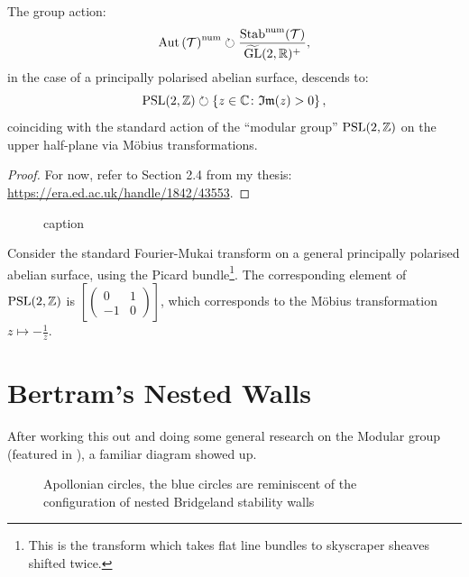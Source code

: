 \documentclass[]{article}
\begin{document}
\begin{theorem}
	\label{thm:modular_group_action}
	The group action:
	\[
		\mathrm{Aut}\left(\mathcal{T}\right)^{\mathrm{num}}
		\circlearrowright
		\frac{
			\mathrm{Stab}^{\mathrm{num}}(\mathcal{T})
		}{
			\widetilde{\mathrm{GL}}(2,\mathbb{R})^+
		},
	\]
	\noindent
	in the case of a principally polarised abelian surface, descends to:
	\[
		\mathrm{PSL}(2, \mathbb{Z})
		\circlearrowright
		\left\{
		z \in \mathbb{C}
		\colon
		\mathfrak{Im}(z) > 0
		\right\},
	\]
	coinciding with the standard action of
	the ``modular group'' $\mathrm{PSL}(2, \mathbb{Z})$
	on the upper half-plane via Möbius transformations.
\end{theorem}

\begin{proof}
	For now, refer to Section 2.4 from my thesis: \url{https://era.ed.ac.uk/handle/1842/43553}.
\end{proof}

\begin{figure}
	
	\caption{caption}
\end{figure}

\begin{example}
	Consider the standard Fourier-Mukai transform on a general principally polarised abelian surface, using the Picard bundle\footnote{This is the transform which takes flat line bundles to skyscraper sheaves shifted twice.}.
	The corresponding element of $\mathrm{PSL}(2, \mathbb{Z})$ is
		{\footnotesize
			\(
			\left[
				\begin{pmatrix}
					0  & 1 \\
					-1 & 0
				\end{pmatrix}
				\right]
			\)},
	which corresponds to the Möbius transformation
	\(
	z \mapsto -\frac{1}{z}
	\).

\end{example}

\section{Bertram's Nested Walls}

After working this out and doing some general research on the Modular group
(featured in ),
a familiar diagram showed up.

\begin{figure}
	
	\caption{Apollonian circles, the blue circles are reminiscent of the configuration of nested Bridgeland stability walls}
\end{figure}
\end{document}
